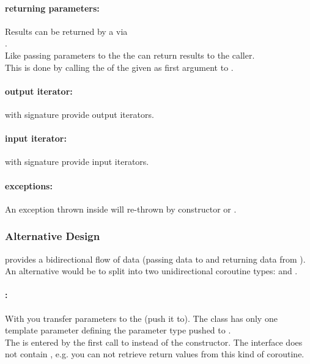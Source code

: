 \paragraph*{returning parameters:}
Results can be returned by a \corofunction via\\\coroop.\\
\newline
Like passing parameters to the \corofunction the \corofunction can return
results to the caller.\\ This is done by calling the \coroop of the \coro given
as first argument to \corofunction.

\paragraph*{output iterator:}
\coro with signature  provide output iterators.

\paragraph*{input iterator:}
\coro with signature  provide input iterators.

\paragraph*{exceptions:}
An exception thrown inside \corofunction will re-thrown by \coro constructor or
\coroop.

\subsubsection*{Alternative Design}
\coro provides a bidirectional flow of data (passing data to and returning data
from \corofunction). An alternative would be to split \coro into two
unidirectional coroutine types: \pushcoro and \pullcoro.\\

\paragraph*{\pushcoro:}
With \pushcoro you transfer parameters to the \corofunction (push it to). The
class has only one template parameter defining the parameter type pushed to
\corofunction.\\
\newline
The \corofunction is entered by the first call to \pushcoroop instead of the
constructor. The interface does not contain \coroget, e.g. you can not
retrieve return values from this kind of coroutine.

